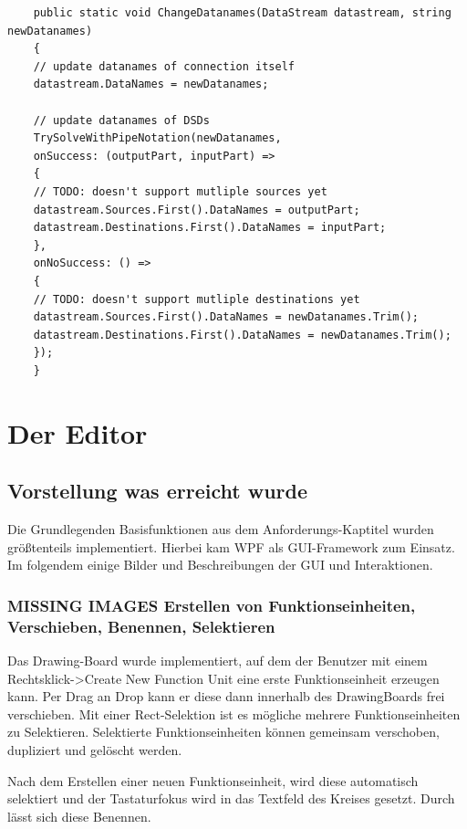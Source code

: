 \begin{enumerate}
	\begin{verbatim}
	public static void ChangeDatanames(DataStream datastream, string newDatanames)
	{
	// update datanames of connection itself
	datastream.DataNames = newDatanames;
	
	// update datanames of DSDs
	TrySolveWithPipeNotation(newDatanames,
	onSuccess: (outputPart, inputPart) =>
	{
	// TODO: doesn't support mutliple sources yet
	datastream.Sources.First().DataNames = outputPart;
	datastream.Destinations.First().DataNames = inputPart;
	},
	onNoSuccess: () =>
	{
	// TODO: doesn't support mutliple destinations yet
	datastream.Sources.First().DataNames = newDatanames.Trim();
	datastream.Destinations.First().DataNames = newDatanames.Trim();
	});
	}
	\end{verbatim}
	
\end{enumerate}



\section{Der Editor}

\subsection{Vorstellung was erreicht wurde}


Die Grundlegenden Basisfunktionen aus dem Anforderungs-Kaptitel wurden größtenteils implementiert. Hierbei kam WPF als GUI-Framework zum Einsatz.
Im folgendem einige Bilder und Beschreibungen der GUI und Interaktionen.


\subsubsection{	MISSING IMAGES Erstellen von Funktionseinheiten, Verschieben, Benennen, Selektieren}

	Das Drawing-Board wurde implementiert, auf dem der Benutzer mit einem
	Rechtsklick->Create New Function Unit eine erste Funktionseinheit erzeugen
	kann. Per Drag an Drop kann er diese dann innerhalb des DrawingBoards frei
	verschieben. Mit einer Rect-Selektion ist es mögliche mehrere
	Funktionseinheiten zu Selektieren. Selektierte Funktionseinheiten können
	gemeinsam verschoben, dupliziert und gelöscht werden.
	
	Nach dem Erstellen einer neuen Funktionseinheit, wird diese automatisch
	selektiert und der Tastaturfokus wird in das Textfeld des Kreises gesetzt.
	Durch lässt sich diese Benennen.
	

